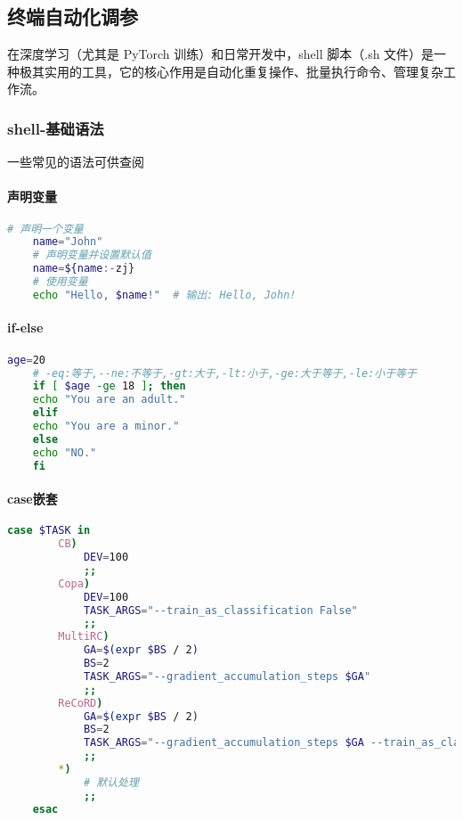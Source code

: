 \subsection{终端自动化调参}
在深度学习（尤其是 PyTorch 训练）和日常开发中，shell 脚本（.sh 文件）是一种极其实用的工具，它的核心作用是自动化重复操作、批量执行命令、管理复杂工作流。
\subsubsection{shell-基础语法}
一些常见的语法可供查阅

\paragraph{声明变量}
\begin{lstlisting}[language=sh,caption={声明变量},label=code:shell_base1]
	# 声明一个变量
	name="John"
	# 声明变量并设置默认值
	name=${name:-zj}
	# 使用变量
	echo "Hello, $name!"  # 输出: Hello, John!
\end{lstlisting}


\paragraph{if-else}
\begin{lstlisting}[language=sh,caption={if-else语法},label=code:shell_base2]
	age=20
	# -eq:等于,--ne:不等于,-gt:大于,-lt:小于,-ge:大于等于,-le:小于等于
	if [ $age -ge 18 ]; then
	echo "You are an adult."
	elif
	echo "You are a minor."
	else
	echo "NO."
	fi	
\end{lstlisting}

\paragraph{case嵌套}
\begin{lstlisting}[language=sh,caption={case嵌套循环示例代码},label=code:shell_base3]
	case $TASK in
		CB)
			DEV=100
			;;
		Copa)
			DEV=100
			TASK_ARGS="--train_as_classification False"
			;;
		MultiRC)
			GA=$(expr $BS / 2)
			BS=2
			TASK_ARGS="--gradient_accumulation_steps $GA"
			;;
		ReCoRD)
			GA=$(expr $BS / 2)
			BS=2
			TASK_ARGS="--gradient_accumulation_steps $GA --train_as_classification False"
			;;
		*)
			# 默认处理
			;;
	esac
\end{lstlisting}


